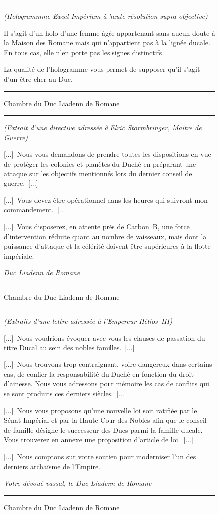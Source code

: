 \documentclass{article}
\newcommand{\newcharacter}{\clearpage\setcounter{figure}{0}}
\newcommand{\indice}[4]{
  \begin{figure}[H]
    \begin{center}
      \rule{0.5\textwidth}{1pt}
    \end{center}
    \begin{framed}
      \begin{samepage}
        \textit{#1}
        \nopagebreak

        #2

        \nopagebreak

        \hfill\textit{#3}
      \end{samepage}
    \end{framed}
    \caption{#4}
    \begin{center}
      \rule{0.5\textwidth}{1pt}
    \end{center}
  \end{figure}
}
\begin{document}
\newcharacter

\indice
{(Hologrammme Excel Impérium à haute résolution supra objective)}
{
    Il s'agit d'un holo d'une femme âgée appartenant sans aucun doute à la
    Maison des Romane mais qui n'appartient pas à la lignée ducale. En tous
    cas, elle n'en porte pas les signes distinctifs.

    \nobreak

    La qualité de l'hologramme vous permet de supposer qu'il s'agit d'un être
    cher au Duc.
}{}
{Chambre du Duc Liadenn de Romane}

\indice
{(Extrait d'une directive adressée à Elric Stormbringer, Maitre de Guerre)}
{
    [...]~Nous vous demandons de prendre toutes les dispositions en vue de
    protéger les colonies et planètes du Duché en préparant une attaque sur les
    objectifs mentionnés lors du dernier conseil de guerre.~[...]

    \nobreak

    [...]~Vous devez être opérationnel dans les heures qui suivront mon
    commandement.~[...]

    \nobreak

    [...]~Vous disposerez, en attente près de Carbon~B, une force
    d'intervention réduite quant au nombre de vaisseaux, mais dont la puissance
    d'attaque et la célérité doivent être supérieures à la flotte impériale.
}{Duc Liadenn de Romane}
{Chambre du Duc Liadenn de Romane}

\indice
{(Extraits d'une lettre adressée à l'Empereur Hélios~III)}
{
    [...]~Nous voudrions évoquer avec vous les clauses de passation du titre
    Ducal au sein des nobles familles.~[...]

    \nobreak

    [...]~Nous trouvons trop contraignant, voire dangereux dans certains cas,
    de confier la responsabilité du Duché en fonction du droit d'ainesse. Nous
    vous adressons pour mémoire les cas de conflits qui se sont produits ces
    derniers siècles.~[...]

    \nobreak

    [...]~Nous vous proposons qu'une nouvelle loi soit ratifiée par le Sénat
    Impérial et par la Haute Cour des Nobles afin que le conseil de famille
    désigne le successeur des Ducs parmi la famille ducale. Vous trouverez en
    annexe une proposition d'article de loi.~[...]

    \nobreak

    [...]~Nous comptons sur votre soutien pour moderniser l'un des derniers
    archaïsme de l'Empire.
}{Votre dévoué vassal, le Duc Liadenn de Romane}
{Chambre du Duc Liadenn de Romane}
\end{document}
